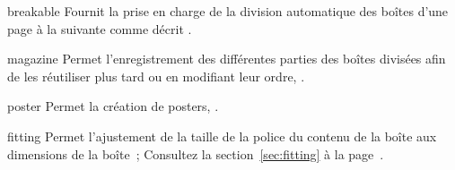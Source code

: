 {%

\begin{docTcbKey}[library]{breakable}{}{}
  Fournit la prise en charge de la division automatique des boîtes d'une page à la suivante
  comme décrit .
\end{docTcbKey}


\begin{docTcbKey}[library]{magazine}{}{}
  Permet l'enregistrement des différentes parties des boîtes divisées afin de les
  réutiliser plus tard ou en modifiant leur ordre, .
\end{docTcbKey}


\begin{docTcbKey}[library]{poster}{}{}
  Permet la création de posters, .
\end{docTcbKey}


\begin{docTcbKey}[library]{fitting}{}{}
  Permet l'ajustement de la taille de la police du contenu de la boîte aux
  dimensions de la boîte~;
  Consultez la section~\ref{sec:fitting} à la page~\pageref{sec:fitting}.
\end{docTcbKey}


}
